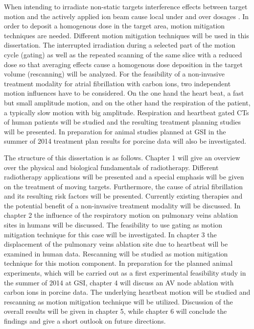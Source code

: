 When intending to irradiate non-static targets interference effects between target motion and the actively applied ion 
beam cause local under and over dosages \cite{Phi92, Ber08}. In order to deposit a homogenous dose in the target area, motion mitigation 
techniques are needed. Different motion mitigation techniques will be used in this dissertation. The interrupted irradiation during a selected 
part of the motion cycle (gating) \cite{Kub96} as well as the repeated scanning of the same slice with a reduced dose so that averaging 
effects cause a homogenous dose deposition in the target volume (rescanning) \cite{Phi92} will be analyzed. 
For the feasibility of a non-invasive treatment modality for atrial fibrillation with carbon ions, two independent 
motion influences have to be considered. On the one hand the heart beat, a fast but small amplitude motion, and on the other hand the 
respiration of the patient, a typically slow motion with big amplitude. Respiration and heartbeat gated CTs of human patients 
will be studied and the resulting treatment planning studies will be presented. In preparation for animal studies planned at GSI in the 
summer of 2014 treatment plan results for porcine data will also be investigated. \newline

The structure of this dissertation is as follows. Chapter 1 will give an overview over the physical and biological fundamentals of radiotherapy. 
Different radiotherapy applications will be presented and a special emphasis will be given on the treatment of moving targets. Furthermore, 
the cause of atrial fibrillation and its resulting risk factors will be presented. Currently existing therapies and the potential 
benefit of a non-invasive treatment modality will be discussed. In chapter 2 the influence of the respiratory motion on 
pulmonary veins ablation sites in humans will be discussed. The feasibility to use gating as motion mitigation technique for this case will 
be investigated. In chapter 3 the displacement of the pulmonary veins ablation site due to heartbeat will be examined in human data. 
Rescanning will be studied as motion mitigation technique for this motion component. In preparation for the planned animal experiments, 
which will be carried out as a first experimental feasibility study in the summer of 2014 at GSI, chapter 4 will discuss 
an AV node ablation with carbon ions in porcine data. The underlying heartbeat motion will be studied and rescanning as motion mitigation 
technique will be utilized. Discussion of the overall results will be given in chapter 5, while chapter 6 will conclude the findings and 
give a short outlook on future directions. 


